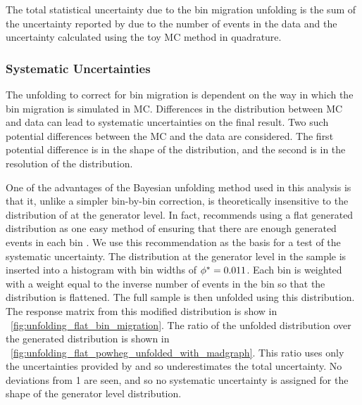 The total statistical uncertainty due to the bin migration unfolding is the
sum of the uncertainty reported by \RooUnfold due to the number of events in
the data and the uncertainty calculated using the toy MC method in quadrature.

\subsubsection{Systematic Uncertainties}
\label{ssec:unfolding_systematic_uncertainties}

The unfolding to correct for bin migration is dependent on the way in which the
bin migration is simulated in MC. Differences in the \phistar distribution
between MC and data can lead to systematic uncertainties on the final result.
Two such potential differences between the MC and the data are considered. The
first potential difference is in the shape of the \phistar distribution, and
the second is in the resolution of the \phistar distribution.

One of the advantages of the Bayesian unfolding method used in this analysis is
that it, unlike a simpler bin-by-bin correction, is theoretically insensitive
to the distribution of \phistar at the generator level. In fact, \DAgostini
recommends using a flat generated distribution as one easy method of ensuring
that there are enough generated events in each bin \cite{dagostini_1995}.
 We use this recommendation as the basis for
a test of the systematic uncertainty. The \phistar distribution at the
generator level in the \MADGRAPH sample is inserted into a histogram with bin
widths of $\phi^{*} = 0.011$. Each bin is weighted with a weight equal to the
inverse number of events in the bin so that the distribution is flattened. The
full \POWHEG sample is then unfolded using this \MADGRAPH distribution. The
response matrix from this modified \MADGRAPH distribution is show in
\FIG~\ref{fig:unfolding_flat_bin_migration}. The ratio of the unfolded \POWHEG
distribution over the generated distribution is shown in
\FIG~\ref{fig:unfolding_flat_powheg_unfolded_with_madgraph}. This ratio uses
only the uncertainties provided by \RooUnfold and so underestimates the total
uncertainty. No deviations from \num{1} are seen, and so no systematic
uncertainty is assigned for the shape of the generator level \phistar
distribution.

